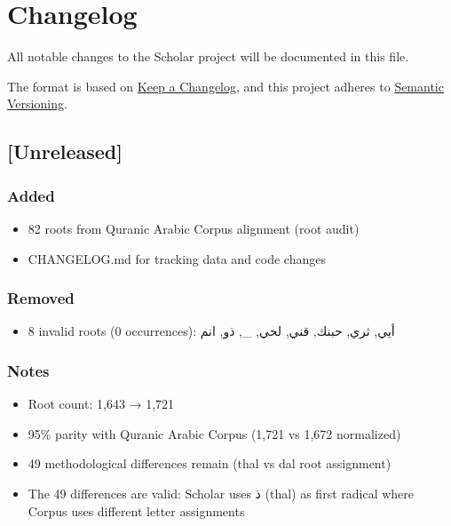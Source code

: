 \documentclass[12pt,a4paper]{article}
\providecommand{\tightlist}{\setlength{\itemsep}{0pt}\setlength{\parskip}{0pt}}
\begin{document}
\section{Changelog}\label{changelog}

All notable changes to the Scholar project will be documented in this
file.

The format is based on \href{https://keepachangelog.com/en/1.1.0/}{Keep
a Changelog}, and this project adheres to
\href{https://semver.org/spec/v2.0.0.html}{Semantic Versioning}.

\subsection{{[}Unreleased{]}}\label{unreleased}

\subsubsection{Added}\label{added}

\begin{itemize}
\tightlist
\item
  82 roots from Quranic Arabic Corpus alignment (root audit)
\item
  CHANGELOG.md for tracking data and code changes
\end{itemize}

\subsubsection{Removed}\label{removed}

\begin{itemize}
\tightlist
\item
  8 invalid roots (0 occurrences): أيي, ثري, حبنك, قني, لحي, \_, ذو, انم
\end{itemize}

\subsubsection{Notes}\label{notes}

\begin{itemize}
\tightlist
\item
  Root count: 1,643 → 1,721
\item
  95\% parity with Quranic Arabic Corpus (1,721 vs 1,672 normalized)
\item
  49 methodological differences remain (thal vs dal root assignment)
\item
  The 49 differences are valid: Scholar uses ذ (thal) as first radical
  where Corpus uses different letter assignments
\end{itemize}
\end{document}
